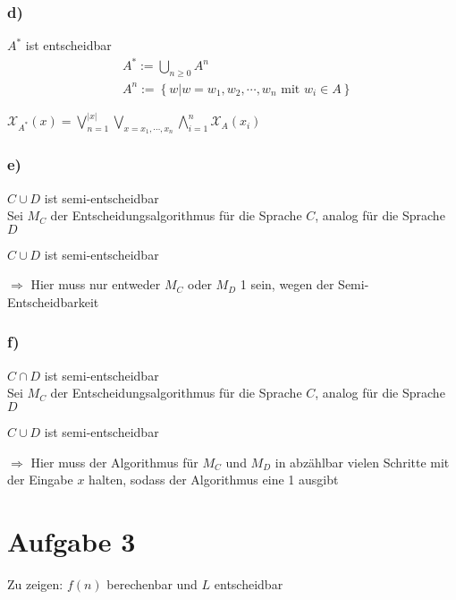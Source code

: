 \documentclass[a4paper,12pt]{article}
\begin{document}
	\subsubsection*{d)}
	$A^*$ ist entscheidbar
	\begin{align*}
		&A^* := \bigcup \limits_{n \geq 0} A^n\\
		&A^n := \left\lbrace w | w = w_1,w_2,\cdots,w_n \text{ mit } w_i \in A\right\rbrace
	\end{align*}
	\begin{center}
		$\mathcal{X}_{A^*} \left(x\right) = \bigvee \limits_{n=1} ^{\left|x\right|} \bigvee \limits_{x=x_1,\cdots,x_n} \bigwedge \limits_{i=1}^{n} \mathcal{X}_{A} \left(x_i\right)$
	\end{center}
	\newpage
	
	\subsubsection*{e)}
	$C \cup D$ ist semi-entscheidbar\\
	
	Sei $M_C$ der Entscheidungsalgorithmus für die Sprache $C$, analog für die Sprache $D$
	\begin{algorithm}[H]
		\caption{$C \cup D$ ist semi-entscheidbar}
	\end{algorithm}
	$\Rightarrow$ Hier muss nur entweder $M_C$ oder $M_D$ 1 sein, wegen der Semi-Entscheidbarkeit
	
	\subsubsection*{f)}
	$C \cap D$ ist semi-entscheidbar\\
	
	Sei $M_C$ der Entscheidungsalgorithmus für die Sprache $C$, analog für die Sprache $D$
	\begin{algorithm}[H]
		\caption{$C \cup D$ ist semi-entscheidbar}
	\end{algorithm}
	$\Rightarrow$ Hier muss der Algorithmus für $M_C$ und $M_D$ in abzählbar vielen Schritte mit der Eingabe $x$ halten, sodass der Algorithmus eine 1 ausgibt
	\newpage
	
	\section*{Aufgabe 3}
	Zu zeigen: $f\left(n\right)$ berechenbar und $L$ entscheidbar
\end{document}
